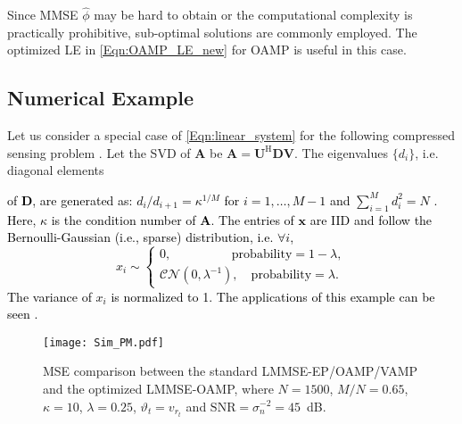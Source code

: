 \documentclass[journal]{IEEEtran}
\newcommand{\mr}{\mathrm}
\newcommand{\BE}{\begin{equation}}
\newcommand{\EE}{\end{equation}}
\renewcommand{\bf}{\bm}
\newcommand{\LL}[1]{\textcolor{black}{#1}}
\begin{document}
{\begin{itemize}
\end{itemize}

Since MMSE $\hat{\phi}$ may be hard to obtain or the computational complexity is practically prohibitive, sub-optimal solutions are commonly employed.  The optimized LE in \eqref{Eqn:OAMP_LE_new} for OAMP is useful in this case.

\subsection{Numerical Example} \label{Sec:simulation} 
Let us consider a special case of \eqref{Eqn:linear_system} for the following compressed sensing problem \cite{Donoho2006}. Let the SVD of $\bf{A}$  be $\bf{A} = \bf{U}^{\mr{H}}\bf{D V}$. The eigenvalues $\{d_i\}$, i.e. diagonal elements} \LL{of $\bf{D}$, are generated as: $d_i/d_{i+1}=\kappa^{1/M}$ for $i = 1,\ldots, M-1$ and $\sum_{i=1}^Md_i^2=N$ \cite{Vila2015}. Here, $\kappa$ is the condition number of $\bf{A}$. The entries of $\bf{x}$ are IID and follow the Bernoulli-Gaussian (i.e., sparse) distribution, i.e. $\forall i$,
\BE
{x_i}\sim\left\{ \begin{array}{l}
0, \qquad\qquad\;\;\; \mathrm{probability} = 1-\lambda,\\
\mathcal{CN}(0,{\lambda ^{ - 1}}),\quad \mathrm{probability} = \lambda.
\end{array} \right.
\EE
The variance of $x_i$ is normalized to 1. The applications of this example can be seen \cite{Ahn2019}.}
\begin{figure}[t]
  \centering
  \texttt{[image: Sim\_PM.pdf]}\\
  \caption{\color{black}MSE comparison between the standard LMMSE-EP/OAMP/VAMP and the optimized LMMSE-OAMP, where $N\!=\!1500$, $M/N\!=\!0.65$, $\kappa\!=\!10$, $\lambda\!=\!0.25$, $\vartheta_t=v_{r_t}$ and $\mr{SNR}=\sigma_n^{-2}=45$~dB.}\label{Fig:Sim_PM}
\end{figure}
\end{document}
